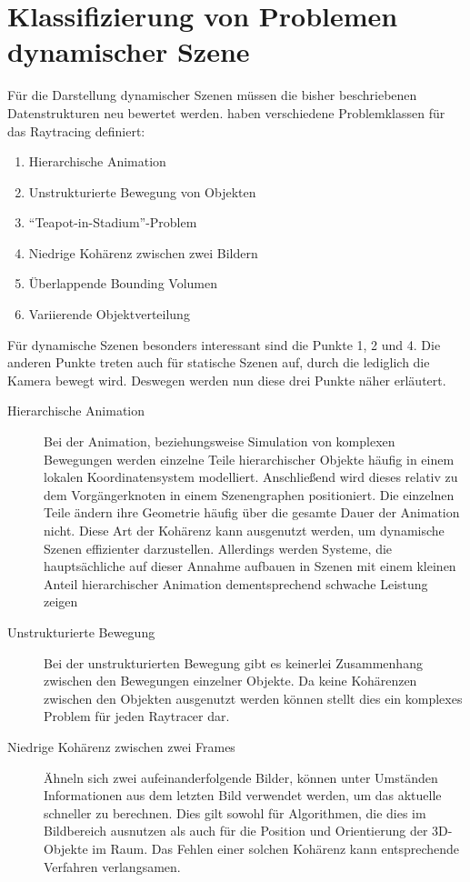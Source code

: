 \section{Klassifizierung von Problemen dynamischer Szene}

Für die Darstellung dynamischer Szenen müssen die bisher beschriebenen Datenstrukturen neu bewertet werden. \cite{BART} haben verschiedene Problemklassen für das Raytracing definiert:

\begin{enumerate}
  \item Hierarchische Animation
  \item Unstrukturierte Bewegung von Objekten
  \item ``Teapot-in-Stadium''-Problem
  \item Niedrige Kohärenz zwischen zwei Bildern
  \item Überlappende Bounding Volumen
  \item Variierende Objektverteilung
\end{enumerate}

Für dynamische Szenen besonders interessant sind die Punkte 1, 2 und 4. Die anderen Punkte treten auch für statische Szenen auf, durch die lediglich die Kamera bewegt wird. Deswegen werden nun diese drei Punkte näher erläutert.

\begin{description}
 \item[Hierarchische Animation] Bei der Animation, beziehungsweise Simulation von komplexen Bewegungen werden einzelne Teile hierarchischer Objekte häufig in einem lokalen Koordinatensystem modelliert. Anschließend wird dieses relativ zu dem Vorgängerknoten in einem Szenengraphen positioniert. Die einzelnen Teile ändern ihre Geometrie häufig über die gesamte Dauer der Animation nicht. Diese Art der Kohärenz kann ausgenutzt werden, um dynamische Szenen effizienter darzustellen. Allerdings werden Systeme, die hauptsächliche auf dieser Annahme aufbauen in Szenen mit einem kleinen Anteil hierarchischer Animation dementsprechend schwache Leistung zeigen
\item[Unstrukturierte Bewegung] Bei der unstrukturierten Bewegung gibt es keinerlei Zusammenhang zwischen den Bewegungen einzelner Objekte. Da keine Kohärenzen zwischen den Objekten ausgenutzt werden können stellt dies ein komplexes Problem für jeden Raytracer dar.
\item[Niedrige Kohärenz zwischen zwei Frames] Ähneln sich zwei aufeinanderfolgende Bilder, können unter Umständen Informationen aus dem letzten Bild verwendet werden, um das aktuelle schneller zu berechnen. Dies gilt sowohl für Algorithmen, die dies im Bildbereich ausnutzen als auch für die Position und Orientierung der 3D-Objekte im Raum. Das Fehlen einer solchen Kohärenz kann entsprechende Verfahren verlangsamen.
 \end{description}

